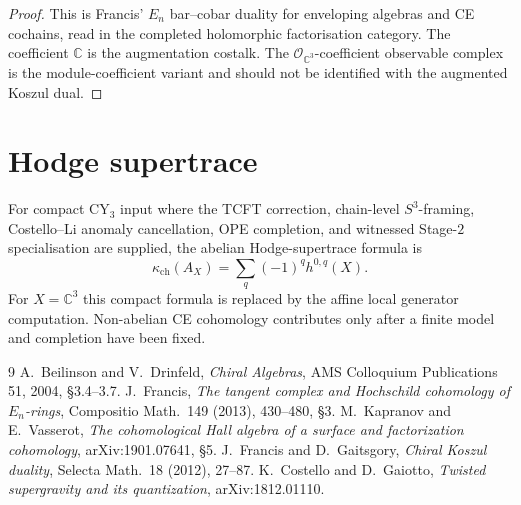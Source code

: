 \documentclass[11pt]{amsart}
\providecommand{\C}{\mathbb{C}}
\providecommand{\cO}{\mathcal{O}}
\theoremstyle{plain}
\theoremstyle{definition}
\theoremstyle{remark}
\begin{document}
\begin{proof}
This is Francis' $E_n$ bar--cobar duality for enveloping algebras and
CE cochains, read in the completed holomorphic factorisation category.
The coefficient $\C$ is the augmentation costalk. The
$\cO_{\C^3}$-coefficient observable complex is the module-coefficient
variant and should not be identified with the augmented Koszul dual.
\end{proof}

\section{Hodge supertrace}
For compact CY$_3$ input where the TCFT correction, chain-level
$S^3$-framing, Costello--Li anomaly cancellation, OPE completion, and
witnessed Stage-$2$ specialisation are supplied, the abelian
Hodge-supertrace formula is
\[
  \kappa_{\mathrm{ch}}(A_X)=\sum_q(-1)^q h^{0,q}(X).
\]
For $X=\C^3$ this compact formula is replaced by the affine local
generator computation. Non-abelian CE cohomology contributes only after a
finite model and completion have been fixed.

\begin{thebibliography}{9}
 A.~Beilinson and V.~Drinfeld, \emph{Chiral Algebras},
  AMS Colloquium Publications 51, 2004, \S3.4--3.7.
 J.~Francis, \emph{The tangent complex and Hochschild
  cohomology of $E_n$-rings}, Compositio Math.\ 149 (2013), 430--480,
  \S3.
 M.~Kapranov and E.~Vasserot,
  \emph{The cohomological Hall algebra of a surface and factorization
  cohomology}, arXiv:1901.07641, \S5.
 J.~Francis and D.~Gaitsgory,
  \emph{Chiral Koszul duality}, Selecta Math.\ 18 (2012), 27--87.
 K.~Costello and D.~Gaiotto, \emph{Twisted
  supergravity and its quantization}, arXiv:1812.01110.
\end{thebibliography}
\end{document}
